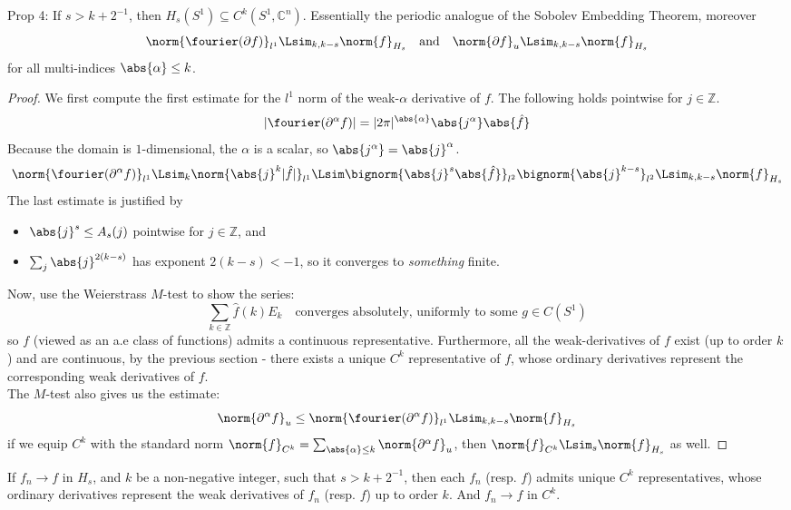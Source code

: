 \documentclass[../main-v2-manifolds.tex]{subfiles}
\begin{document}
\begin{wts}
Prop 4: If $s>k+2^{-1}$, then $H_s(S^1)\subseteq C^k(S^1,\mathbb{C}^n)$. Essentially the periodic analogue of the Sobolev Embedding Theorem, moreover
\[
\norm{\fourier(\partial f)}_{l^1}\Lsim_{k,k-s}\norm{f}_{H_s}\quad\text{and}\quad \norm{\partial f}_{u}\Lsim_{k,k-s}\norm{f}_{H_s}
\]
for all multi-indices $\abs{\alpha}\leq k$. 
\end{wts}
\begin{proof}
We first compute the first estimate for the $l^1$ norm of the weak-$\alpha$ derivative of $f$. The following holds pointwise for $j\in\mathbb{Z}$.
\[
\vert\fourier(\partial^\alpha f)\vert = \vert 2\pi\vert^{\abs{\alpha}}\abs{ j^\alpha}\abs{\hat{f}}
\]
Because the domain is $1$-dimensional, the $\alpha$ is a scalar, so $\abs{j^\alpha} = \abs{j}^\alpha$. 
\[
\norm{\fourier(\partial^\alpha f)}_{l^1}\Lsim_k \norm{\abs{j}^k\vert \hat{f}\vert}_{l^1}\Lsim \bignorm{\abs{j}^s\abs{\hat{f}}}_{l^2}\bignorm{\abs{j}^{k-s}}_{l^2}\Lsim_{k,k-s}\norm{f}_{H_s}
\]
The last estimate is justified by
\begin{itemize}
    \item $\abs{j}^s\leq A_s(j)$ pointwise for $j\in\mathbb{Z}$, and
    \item $\sum_{j}\abs{j}^{2(k-s)}$ has exponent $2(k-s)<-1$, so it converges to \emph{something} finite.
\end{itemize}
Now, use the Weierstrass $M$-test to show the series:
\[
\sum_{k\in\mathbb{Z}}\hat{f}(k)E_k\quad\text{converges absolutely, uniformly to some }g\in C(S^1)
\]
so $f$ (viewed as an a.e class of functions) admits a continuous representative. Furthermore, all the weak-derivatives of $f$ exist (up to order $k$) and are continuous, by the previous section - there exists a unique $C^k$ representative of $f$, whose ordinary derivatives represent the corresponding weak derivatives of $f$.\\

The $M$-test also gives us the estimate:
\[
\norm{\partial^\alpha f}_u\leq\norm{\fourier(\partial^\alpha f)}_{l^1}\Lsim_{k,k-s} \norm{f}_{H_s}
\]
if we equip $C^k$ with the standard norm $\norm{f}_{C^k} = \sum_{\abs{\alpha}\leq k}\norm{\partial^\alpha f}_u$, then $\norm{f}_{C^k}\Lsim_s \norm{f}_{H_s}$ as well.
\end{proof}
\begin{corollary}
If $f_n\to f$ in $H_s$, and $k$ be a non-negative integer, such that $s > k + 2^{-1}$, then each $f_n$ (resp. $f$) admits unique $C^k$ representatives, whose ordinary derivatives represent the weak derivatives of $f_n$ (resp. $f$) up to order $k$. And $f_n\to f$ in $C^k$.
\end{corollary}
\end{document}
